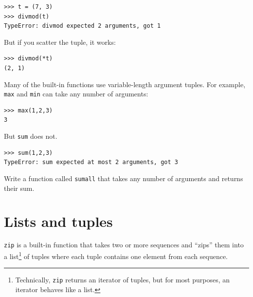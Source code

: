 \documentclass[10pt]{book}
\begin{document}

%



\beforeverb
\begin{verbatim}
>>> t = (7, 3)
>>> divmod(t)
TypeError: divmod expected 2 arguments, got 1
\end{verbatim}
\afterverb
%
But if you scatter the tuple, it works:

\beforeverb
\begin{verbatim}
>>> divmod(*t)
(2, 1)
\end{verbatim}
\afterverb
%
\begin{ex}
Many of the built-in functions use
variable-length argument tuples.  For example, {\tt max}
and {\tt min} can take any number of arguments:


\beforeverb
\begin{verbatim}
>>> max(1,2,3)
3
\end{verbatim}
\afterverb
%
But {\tt sum} does not.


\beforeverb
\begin{verbatim}
>>> sum(1,2,3)
TypeError: sum expected at most 2 arguments, got 3
\end{verbatim}
\afterverb
%
Write a function called {\tt sumall} that takes any number
of arguments and returns their sum.

\end{ex}


\section{Lists and tuples}


{\tt zip} is a built-in function that takes two or more sequences and
``zips'' them into a list\footnote{Technically, {\tt zip} returns an
  iterator of tuples, but for most purposes, an iterator behaves like
  a list.} of tuples where each tuple contains one element from each
sequence.
\end{document}
